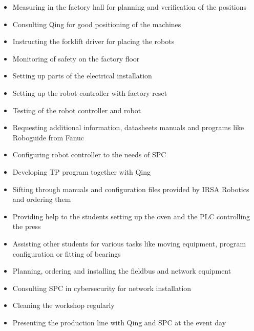 \begin{itemize}
	\item Measuring in the factory hall for planning and verification of the positions
	\item Consulting Qing for good positioning of the machines
	\item Instructing the forklift driver for placing the robots
	\item Monitoring of safety on the factory floor
	\item Setting up parts of the electrical installation
	\item Setting up the robot controller with factory reset
	\item Testing of the robot controller and robot
	\item Requesting additional information, datasheets manuals and programs like Roboguide from Fanuc
	\item Configuring robot controller to the needs of SPC
	\item Developing TP program together with Qing
	\item Sifting through manuals and configuration files provided by IRSA Robotics and ordering them
	\item Providing help to the students setting up the oven and  the PLC controlling the press 
	\item Assisting other students for various tasks like moving equipment, program configuration or fitting of bearings
	\item Planning, ordering and installing the fieldbus and network equipment
	\item Consulting SPC in cybersecurity for network installation
	\item Cleaning the workshop regularly
	\item Presenting the production line with Qing and SPC at the event day
\end{itemize}